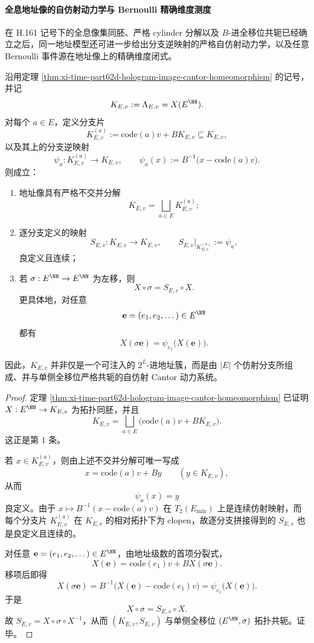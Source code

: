 \paragraph{全息地址像的自仿射动力学与 Bernoulli 精确维度测度}
在 H.161 记号下的全息像集同胚、严格 cylinder 分解以及 \(B\)-进全移位共轭已经确立之后，同一地址模型还可进一步给出分支逆映射的严格自仿射动力学，以及任意 Bernoulli 事件源在地址像上的精确维度闭式。

\begin{theorem}\label{thm:xi-time-part62dc-hologram-selfaffine-cantor-dynamics}
沿用定理 \ref{thm:xi-time-part62d-hologram-image-cantor-homeomorphism} 的记号，并记
\[
K_{E,v}:=\Lambda_{E,v}=X(E^{\NN}).
\]
对每个 \(a\in E\)，定义分支片
\[
K_{E,v}^{(a)}:=\mathrm{code}(a)v+B K_{E,v}\subseteq K_{E,v},
\]
以及其上的分支逆映射
\[
\psi_a:K_{E,v}^{(a)}\to K_{E,v},
\qquad
\psi_a(x):=B^{-1}\!\bigl(x-\mathrm{code}(a)v\bigr).
\]
则成立：
\begin{enumerate}
  \item 地址像具有严格不交并分解
  \[
  K_{E,v}=\bigsqcup_{a\in E}K_{E,v}^{(a)};
  \]
  \item 逐分支定义的映射
  \[
  S_{E,v}:K_{E,v}\to K_{E,v},
  \qquad
  S_{E,v}\big|_{K_{E,v}^{(a)}}:=\psi_a,
  \]
  良定义且连续；
  \item 若 \(\sigma:E^{\NN}\to E^{\NN}\) 为左移，则
  \[
  X\circ \sigma=S_{E,v}\circ X.
  \]
  更具体地，对任意
  \[
  \mathbf e=(e_1,e_2,\dots)\in E^{\NN}
  \]
  都有
  \[
  X(\sigma \mathbf e)=\psi_{e_1}\!\bigl(X(\mathbf e)\bigr).
  \]
\end{enumerate}
因此，\(K_{E,v}\) 并非仅是一个可注入的 \(2^L\)-进地址簇，而是由 \(|E|\) 个仿射分支所组成、并与单侧全移位严格共轭的自仿射 Cantor 动力系统。
\end{theorem}
\begin{proof}
定理 \ref{thm:xi-time-part62d-hologram-image-cantor-homeomorphism} 已证明 \(X:E^{\NN}\to K_{E,v}\) 为拓扑同胚，并且
\[
K_{E,v}
=
\bigsqcup_{a\in E}\bigl(\mathrm{code}(a)v+B K_{E,v}\bigr).
\]
这正是第 \(1\) 条。

若 \(x\in K_{E,v}^{(a)}\)，则由上述不交并分解可唯一写成
\[
x=\mathrm{code}(a)v+B y
\qquad (y\in K_{E,v}),
\]
从而
\[
\psi_a(x)=y
\]
良定义。由于 \(x\mapsto B^{-1}(x-\mathrm{code}(a)v)\) 在 \(T_2(E_{\min})\) 上是连续仿射映射，而每个分支片 \(K_{E,v}^{(a)}\) 在 \(K_{E,v}\) 的相对拓扑下为 clopen，故逐分支拼接得到的 \(S_{E,v}\) 也是良定义且连续的。

对任意 \(\mathbf e=(e_1,e_2,\dots)\in E^{\NN}\)，由地址级数的首项分裂式，
\[
X(\mathbf e)
=
\mathrm{code}(e_1)v+B X(\sigma \mathbf e).
\]
移项后即得
\[
X(\sigma \mathbf e)
=
B^{-1}\!\bigl(X(\mathbf e)-\mathrm{code}(e_1)v\bigr)
=
\psi_{e_1}\!\bigl(X(\mathbf e)\bigr).
\]
于是
\[
X\circ \sigma=S_{E,v}\circ X.
\]
故 \(S_{E,v}=X\circ \sigma\circ X^{-1}\)，从而 \((K_{E,v},S_{E,v})\) 与单侧全移位 \((E^{\NN},\sigma)\) 拓扑共轭。证毕。
\end{proof}

